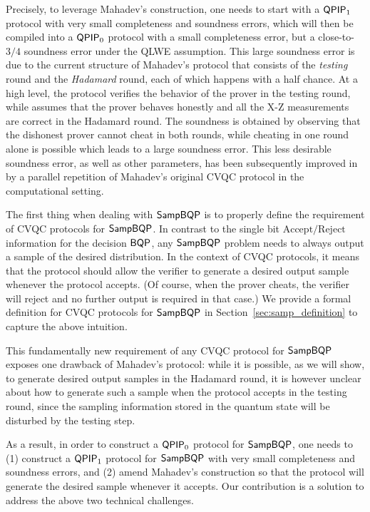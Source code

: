 Precisely, to leverage Mahadev's construction, one needs to start with a $\operatorname{\mathsf{QPIP}}_1$ protocol with very small completeness and soundness errors, which will then be compiled into a $\operatorname{\mathsf{QPIP}}_0$ protocol with a small completeness error, but a close-to-$3/4$ soundness error under the QLWE assumption.  
This large soundness error is due to the current structure of Mahadev's protocol that consists of the \emph{testing} round and the \emph{Hadamard} round, each of which happens with a half chance. 
At a high level, the protocol verifies the behavior of the prover in the testing round, while assumes that the prover behaves honestly and all the X-Z measurements are correct in the Hadamard round. 
The soundness is obtained by observing that the dishonest prover cannot cheat in both rounds, while cheating in one round alone is possible which leads to a large soundness error. 
This less desirable soundness error, as well as other parameters, has been subsequently improved in \cite{arXiv:AlaChiHun19, arXiv:ChiaChungYam19} by a parallel repetition of Mahadev's original CVQC protocol in the computational setting. 

The first thing when dealing with $\operatorname{\mathsf{SampBQP}}$ is to properly define the requirement of CVQC protocols for $\operatorname{\mathsf{SampBQP}}$. 
In contrast to the single bit $\mathrm{Accept/Reject}$ information for the decision $\operatorname{\mathsf{BQP}}$, any $\operatorname{\mathsf{SampBQP}}$ problem needs to always output a sample of the desired distribution.
In the context of CVQC protocols, it means that the protocol should allow the verifier to generate a desired output sample whenever the protocol accepts. 
(Of course, when the prover cheats, the verifier will reject and no further output is required in that case.)
We provide a formal definition for CVQC protocols for $\operatorname{\mathsf{SampBQP}}$ in Section~\ref{sec:samp_definition} to capture the above intuition. 


This fundamentally new requirement of any CVQC protocol for $\operatorname{\mathsf{SampBQP}}$ exposes one drawback of Mahadev's protocol: 
while it is possible, as we will show, to generate desired output samples in the Hadamard round, 
it is however unclear about how to generate such a sample when the protocol accepts in the testing round, since the sampling information stored in the quantum state will be disturbed by the testing step. 

As a result, in order to construct a $\operatorname{\mathsf{QPIP}}_0$ protocol for $\operatorname{\mathsf{SampBQP}}$,  one needs to (1) construct a $\operatorname{\mathsf{QPIP}}_1$ protocol for $\operatorname{\mathsf{SampBQP}}$ with very small completeness and soundness errors, and (2) amend Mahadev's construction so that the protocol will generate the desired sample whenever it accepts. 
Our contribution is a solution to address the above two technical challenges. 

